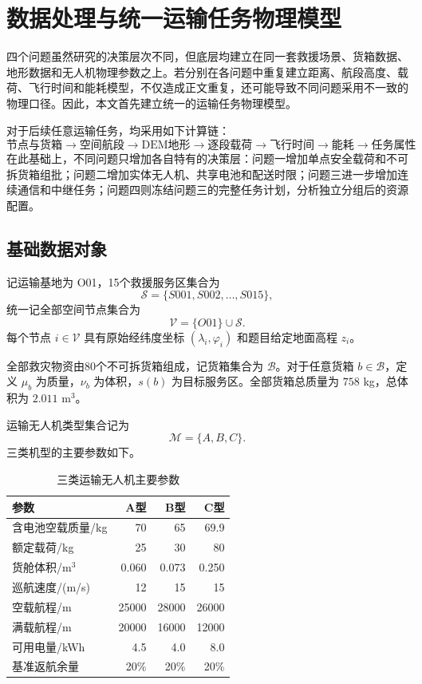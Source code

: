 \documentclass[UTF8,a4paper,12pt]{ctexart}
\begin{document}
\section{数据处理与统一运输任务物理模型}
\label{sec:foundation}

四个问题虽然研究的决策层次不同，但底层均建立在同一套救援场景、货箱数据、地形数据和无人机物理参数之上。若分别在各问题中重复建立距离、航段高度、载荷、飞行时间和能耗模型，不仅造成正文重复，还可能导致不同问题采用不一致的物理口径。因此，本文首先建立统一的运输任务物理模型。

对于后续任意运输任务，均采用如下计算链：
\[
\boxed{
\text{节点与货箱}
\rightarrow
\text{空间航段}
\rightarrow
\text{DEM地形}
\rightarrow
\text{逐段载荷}
\rightarrow
\text{飞行时间}
\rightarrow
\text{能耗}
\rightarrow
\text{任务属性}
}
\]
在此基础上，不同问题只增加各自特有的决策层：问题一增加单点安全载荷和不可拆货箱组批；问题二增加实体无人机、共享电池和配送时限；问题三进一步增加连续通信和中继任务；问题四则冻结问题三的完整任务计划，分析独立分组后的资源配置。

\subsection{基础数据对象}

记运输基地为 O01，15个救援服务区集合为
\[
\mathcal S=\{S001,S002,\ldots,S015\},
\]
统一记全部空间节点集合为
\[
\mathcal V=\{O01\}\cup\mathcal S.
\]
每个节点 $i\in\mathcal V$ 具有原始经纬度坐标 $(\lambda_i,\varphi_i)$ 和题目给定地面高程 $z_i$。

全部救灾物资由80个不可拆货箱组成，记货箱集合为 $\mathcal B$。对于任意货箱 $b\in\mathcal B$，定义 $\mu_b$ 为质量，$\nu_b$ 为体积，$s(b)$ 为目标服务区。全部货箱总质量为 $758$ kg，总体积为 $2.011$ m$^3$。

运输无人机类型集合记为
\[
\mathcal M=\{A,B,C\}.
\]
三类机型的主要参数如下。

\begin{table}[H]
\centering
\caption{三类运输无人机主要参数}
\label{tab:common_drone}
\begin{tabular}{lrrr}
\toprule
参数 & A型 & B型 & C型\\
\midrule
含电池空载质量/kg & 70 & 65 & 69.9\\
额定载荷/kg & 25 & 30 & 80\\
货舱体积/m$^3$ & 0.060 & 0.073 & 0.250\\
巡航速度/(m/s) & 12 & 15 & 15\\
空载航程/m & 25000 & 28000 & 26000\\
满载航程/m & 20000 & 16000 & 12000\\
可用电量/kWh & 4.5 & 4.0 & 8.0\\
基准返航余量 & 20\% & 20\% & 20\%\\
\bottomrule
\end{tabular}
\end{table}
\end{document}
